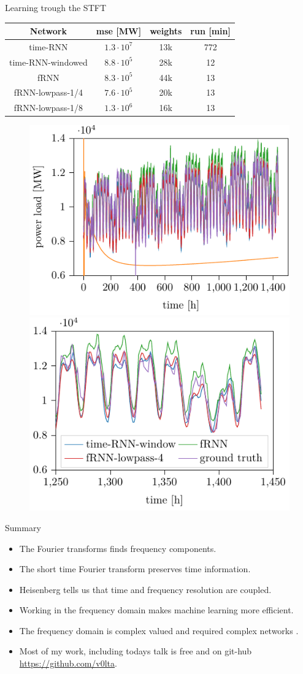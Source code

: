 \documentclass[xcolor=dvipsnames]{beamer}
\begin{document}
\begin{frame}{Learning trough the STFT \cite{wolter2018Fourier}}
\centering
\begin{tabular}{c c c c}
  Network   & mse [MW] & weights  & run [min]  \\\hline 
  time-RNN   & $1.3 \cdot 10^7$&  13k & 772 \\
  time-RNN-windowed   & $8.8 \cdot 10^5$&  28k & 12 \\
  fRNN   & $8.3 \cdot 10^5$&  44k & 13 \\
  fRNN-lowpass-1/4   & $7.6 \cdot 10^5$&  20k & 13 \\
  fRNN-lowpass-1/8   & $1.3 \cdot 10^6$&  16k & 13 \\
\end{tabular}
\begin{figure}
    \centering
    \includegraphics[width=0.48\linewidth]{./img/comparison_60d_fit.pdf}
    \includegraphics[width=0.48\linewidth]{./img/comparison_last_week_60d_fit.pdf}
\end{figure}
\end{frame}

\begin{frame}{Summary}
\begin{itemize}
\item The Fourier transforms finds frequency components.
\item The short time Fourier transform preserves time information.
\item Heisenberg tells us that time and frequency resolution are coupled.
\item Working in the frequency domain makes machine learning more efficient.
\item The frequency domain is complex valued and required complex networks \cite{wolter2018complexgated}.
\item Most of my work, including todays talk is free and on git-hub \url{https://github.com/v0lta}.
\end{itemize}

\end{frame}
\end{document}

